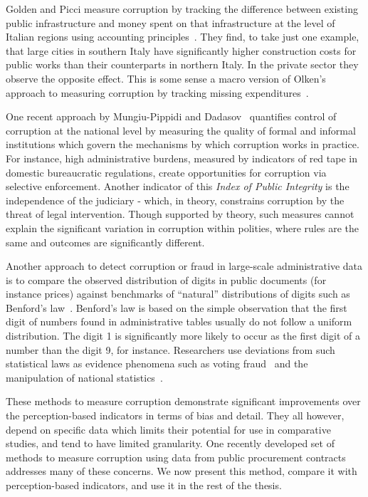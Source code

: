 Golden and Picci measure corruption by tracking the difference between existing public infrastructure and money spent on that infrastructure at the level of Italian regions using accounting principles~\cite{golden2005proposal}. They find, to take just one example, that large cities in southern Italy have significantly higher construction costs for public works than their counterparts in northern Italy. In the private sector they observe the opposite effect. This is some sense a macro version of Olken's approach to measuring corruption by tracking missing expenditures~\cite{olken2007monitoring}. 

One recent approach by Mungiu-Pippidi and Dadasov~\cite{mungiu2016measuring} quantifies control of corruption at the national level by measuring the quality of formal and informal institutions which govern the mechanisms by which corruption works in practice. For instance, high administrative burdens, measured by indicators of red tape in domestic bureaucratic regulations, create opportunities for corruption via selective enforcement. Another indicator of this \textit{Index of Public Integrity} is the independence of the judiciary - which, in theory, constrains corruption by the threat of legal intervention. Though supported by theory, such measures cannot explain the significant variation in corruption within polities, where rules are the same and outcomes are significantly different. 

Another approach to detect corruption or fraud in large-scale administrative data is to compare the observed distribution of digits in public documents (for instance prices) against benchmarks of ``natural'' distributions of digits such as Benford's law~\cite{beber2012numbers}. Benford's law is based on the simple observation that the first digit of numbers found in administrative tables usually do not follow a uniform distribution. The digit 1 is significantly more likely to occur as the first digit of a number than the digit 9, for instance. Researchers use deviations from such statistical laws as evidence phenomena such as voting fraud~\cite{beber2012numbers} and the manipulation of national statistics~\cite{rauch2014deficit}.

These methods to measure corruption demonstrate significant improvements over the perception-based indicators in terms of bias and detail. They all however, depend on specific data which limits their potential for use in comparative studies, and tend to have limited granularity. One recently developed set of methods to measure corruption using data from public procurement contracts addresses many of these concerns. We now present this method, compare it with perception-based indicators, and use it in the rest of the thesis.

